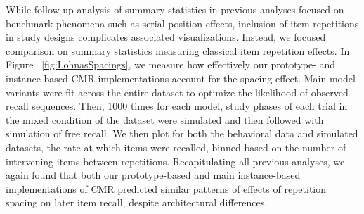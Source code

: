 {}While follow-up analysis of summary statistics in previous analyses focused on benchmark phenomena such as serial position effects, inclusion of item repetitions in study designs complicates associated visualizations. Instead, we focused comparison on summary statistics measuring classical item repetition effects. In Figure ~\ref{fig:LohnasSpacings}, we measure how effectively our prototype- and instance-based CMR implementations account for the spacing effect. Main model variants were fit across the entire dataset to optimize the likelihood of observed recall sequences. Then, 1000 times for each model, study phases of each trial in the mixed condition of the dataset were simulated and then followed with simulation of free recall. We then plot for both the behavioral data and simulated datasets, the rate at which items were recalled, binned based on the number of intervening items between repetitions. Recapitulating all previous analyses, we again found that both our prototype-based and main instance-based implementations of CMR predicted similar patterns of effects of repetition spacing on later item recall, despite architectural differences.\relax